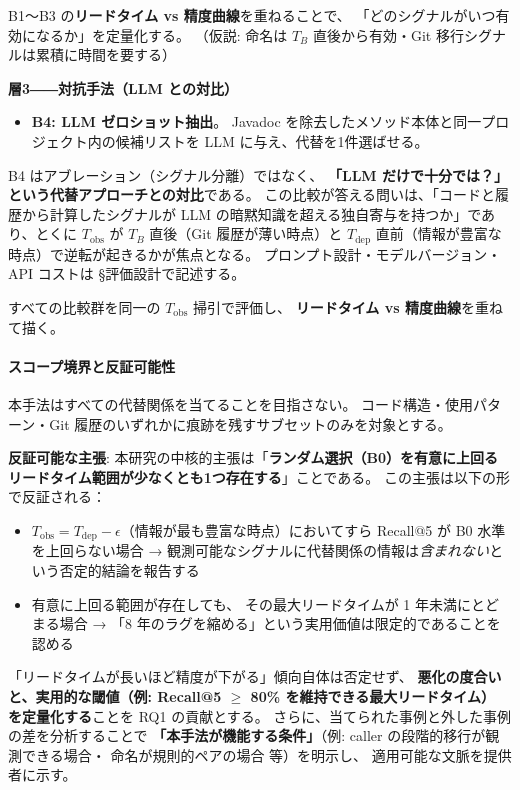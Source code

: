 \documentclass[a4paper,12pt]{article}
\begin{document}
B1〜B3 の\textbf{リードタイム vs 精度曲線}を重ねることで、
「どのシグナルがいつ有効になるか」を定量化する。
（仮説: 命名は $T_B$ 直後から有効・Git 移行シグナルは累積に時間を要する）

\medskip
\noindent\textbf{層3――対抗手法（LLM との対比）}

\begin{itemize}
  \item \textbf{B4: LLM ゼロショット抽出}。
        Javadoc を除去したメソッド本体と同一プロジェクト内の候補リストを
        LLM に与え、代替を1件選ばせる。
\end{itemize}

B4 はアブレーション（シグナル分離）ではなく、
\textbf{「LLM だけで十分では？」という代替アプローチとの対比}である。
この比較が答える問いは、「コードと履歴から計算したシグナルが
LLM の暗黙知識を超える独自寄与を持つか」であり、とくに
$T_\text{obs}$ が $T_B$ 直後（Git 履歴が薄い時点）と
$T_\text{dep}$ 直前（情報が豊富な時点）で逆転が起きるかが焦点となる。
プロンプト設計・モデルバージョン・API コストは §評価設計で記述する。

\medskip
すべての比較群を同一の $T_{\text{obs}}$ 掃引で評価し、
\textbf{リードタイム vs 精度曲線}を重ねて描く。

\paragraph{スコープ境界と反証可能性}

本手法はすべての代替関係を当てることを目指さない。
コード構造・使用パターン・Git 履歴のいずれかに痕跡を残すサブセットのみを対象とする。

\textbf{反証可能な主張}:
本研究の中核的主張は「\textbf{ランダム選択（B0）を有意に上回る
リードタイム範囲が少なくとも1つ存在する}」ことである。
この主張は以下の形で反証される：

\begin{itemize}
  \item $T_\text{obs} = T_\text{dep} - \epsilon$（情報が最も豊富な時点）においてすら
        Recall@5 が B0 水準を上回らない場合 →
        観測可能なシグナルに代替関係の情報は\emph{含まれない}という否定的結論を報告する
  \item 有意に上回る範囲が存在しても、
        その最大リードタイムが 1 年未満にとどまる場合 →
        「8 年のラグを縮める」という実用価値は限定的であることを認める
\end{itemize}

「リードタイムが長いほど精度が下がる」傾向自体は否定せず、
\textbf{悪化の度合いと、実用的な閾値（例: Recall@5 $\geq$ 80\% を維持できる最大リードタイム）
を定量化する}ことを RQ1 の貢献とする。
さらに、当てられた事例と外した事例の差を分析することで
\textbf{「本手法が機能する条件」}（例: caller の段階的移行が観測できる場合・
命名が規則的ペアの場合 等）を明示し、
適用可能な文脈を提供者に示す。
\end{document}
